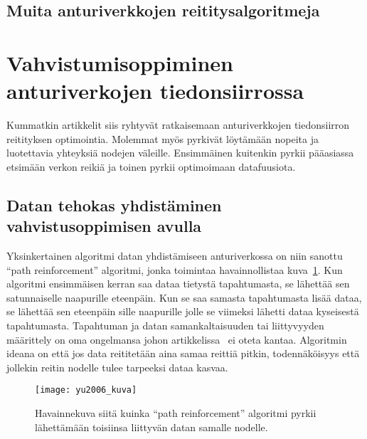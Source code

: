 
\subsection{Muita anturiverkkojen reititysalgoritmeja}

\section{Vahvistumisoppiminen anturiverkojen tiedonsiirrossa}

Kummatkin artikkelit siis ryhtyvät ratkaisemaan anturiverkkojen tiedonsiirron
reitityksen optimointia. Molemmat myös pyrkivät löytämään nopeita ja
luotettavia yhteyksiä nodejen väleille. Ensimmäinen kuitenkin pyrkii pääasiassa
etsimään verkon reikiä ja toinen pyrkii optimoimaan datafuusiota.


\subsection{Datan tehokas yhdistäminen vahvistusoppimisen avulla}

Yksinkertainen algoritmi datan yhdistämiseen anturiverkossa on niin sanottu
``path reinforcement'' algoritmi, jonka toimintaa havainnollistaa
kuva~\ref{fig:yu2006}. Kun algoritmi ensimmäisen kerran saa dataa tietystä
tapahtumasta, se lähettää sen satunnaiselle naapurille eteenpäin. Kun se saa
samasta tapahtumasta lisää dataa, se lähettää sen eteenpäin sille naapurille
jolle se viimeksi lähetti dataa kyseisestä tapahtumasta.  Tapahtuman ja datan
samankaltaisuuden tai liittyvyyden määrittely on oma ongelmansa johon
artikkelissa~\cite{Yu2006} ei oteta kantaa. Algoritmin ideana on että jos data
reititetään aina samaa reittiä pitkin, todennäköisyys että jollekin reitin
nodelle tulee tarpeeksi dataa kasvaa.

\begin{figure}[h]
  \centering
  \texttt{[image: yu2006\_kuva]}
  \caption{Havainnekuva siitä kuinka ``path reinforcement'' algoritmi pyrkii
    lähettämään toisiinsa liittyvän datan samalle nodelle.~\parencite{Yu2006}}
\label{fig:yu2006}
\end{figure}

